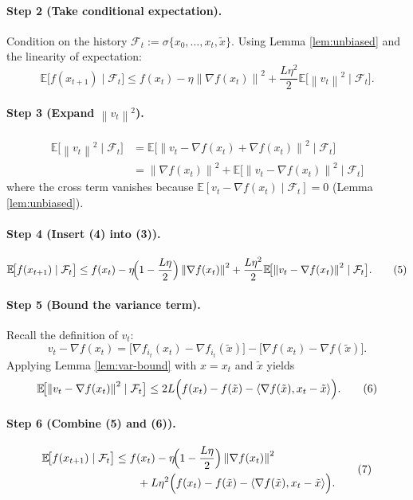 \documentclass[11pt]{article}
\newcommand{\E}{\mathbb{E}}
\newcommand{\norm}[1]{\left\|#1\right\|}
\newcommand{\inner}[2]{\left\langle #1,#2 \right\rangle}
\begin{document}
\paragraph{Step 2 (Take conditional expectation).}
Condition on the history $\mathcal{F}_t:=\sigma\{x_0,\dots,x_t,\tilde{x}\}$.
Using Lemma \ref{lem:unbiased} and the linearity of expectation:
\[
\E\!\bigl[f(x_{t+1})\mid\mathcal{F}_t\bigr]
\le f(x_t)-\eta\norm{\nabla f(x_t)}^{2}
+\frac{L\eta^{2}}{2}\E\!\bigl[\norm{v_t}^{2}\mid\mathcal{F}_t\bigr].
\tag{3}
\]

\paragraph{Step 3 (Expand $\norm{v_t}^{2}$).}
\[
\begin{aligned}
\E\!\bigl[\norm{v_t}^{2}\mid\mathcal{F}_t\bigr]
&=\E\!\bigl[\norm{v_t-\nabla f(x_t)+\nabla f(x_t)}^{2}\mid\mathcal{F}_t\bigr]\\
&=\norm{\nabla f(x_t)}^{2}
+ \E\!\bigl[\norm{v_t-\nabla f(x_t)}^{2}\mid\mathcal{F}_t\bigr]
\tag{4}
\end{aligned}
\]
where the cross term vanishes because $\E[v_t-\nabla f(x_t)\mid\mathcal{F}_t]=0$ (Lemma \ref{lem:unbiased}).

\paragraph{Step 4 (Insert (4) into (3)).}
\[
\E\!\bigl[f(x_{t+1})\mid\mathcal{F}_t\bigr]
\le f(x_t)-\eta\!\Bigl(1-\frac{L\eta}{2}\Bigr)\norm{\nabla f(x_t)}^{2}
+\frac{L\eta^{2}}{2}\E\!\bigl[\norm{v_t-\nabla f(x_t)}^{2}\mid\mathcal{F}_t\bigr].
\tag{5}
\]

\paragraph{Step 5 (Bound the variance term).}
Recall the definition of $v_t$:
\[
v_t-\nabla f(x_t)
=
\bigl[\nabla f_{i_t}(x_t)-\nabla f_{i_t}(\tilde{x})\bigr]
-\bigl[\nabla f(x_t)-\nabla f(\tilde{x})\bigr].
\]
Applying Lemma \ref{lem:var-bound} with $x=x_t$ and $\tilde{x}$ yields
\[
\E\!\bigl[\norm{v_t-\nabla f(x_t)}^{2}\mid\mathcal{F}_t\bigr]
\le
2L\Bigl(f(x_t)-f(\tilde{x})-\inner{\nabla f(\tilde{x})}{x_t-\tilde{x}}\Bigr).
\tag{6}
\]

\paragraph{Step 6 (Combine (5) and (6)).}
\[
\begin{aligned}
\E\!\bigl[f(x_{t+1})\mid\mathcal{F}_t\bigr]
&\le f(x_t)-\eta\!\Bigl(1-\frac{L\eta}{2}\Bigr)\norm{\nabla f(x_t)}^{2}\\
&\qquad+L\eta^{2}\Bigl(f(x_t)-f(\tilde{x})-\inner{\nabla f(\tilde{x})}{x_t-\tilde{x}}\Bigr).
\end{aligned}
\tag{7}
\]
\end{document}
